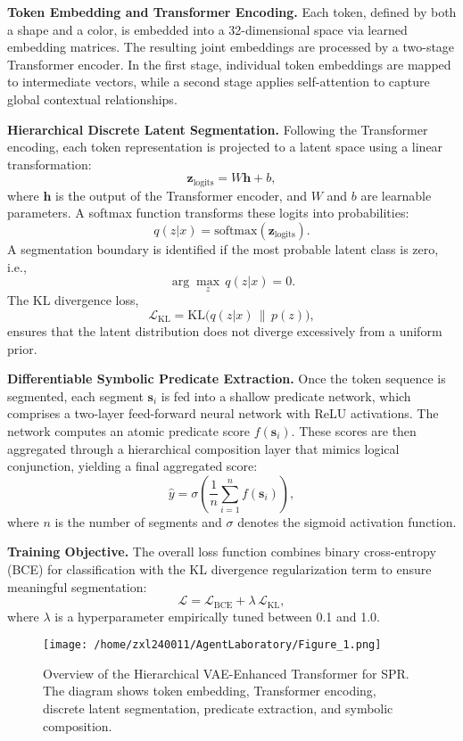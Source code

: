 \documentclass{article}
\begin{document}
\textbf{Token Embedding and Transformer Encoding.} Each token, defined by both a shape and a color, is embedded into a 32-dimensional space via learned embedding matrices. The resulting joint embeddings are processed by a two-stage Transformer encoder. In the first stage, individual token embeddings are mapped to intermediate vectors, while a second stage applies self-attention to capture global contextual relationships.

\textbf{Hierarchical Discrete Latent Segmentation.} Following the Transformer encoding, each token representation is projected to a latent space using a linear transformation:
\[
\mathbf{z}_{\text{logits}} = W\mathbf{h} + b,
\]
where $\mathbf{h}$ is the output of the Transformer encoder, and $W$ and $b$ are learnable parameters. A softmax function transforms these logits into probabilities:
\[
q(z|x)=\text{softmax}(\mathbf{z}_{\text{logits}}).
\]
A segmentation boundary is identified if the most probable latent class is zero, i.e., 
\[
\arg\max_z\,q(z|x)=0.
\]
The KL divergence loss, 
\[
\mathcal{L}_{\text{KL}} = \mathrm{KL}\bigl(q(z|x) \,\|\, p(z)\bigr),
\]
ensures that the latent distribution does not diverge excessively from a uniform prior.

\textbf{Differentiable Symbolic Predicate Extraction.} Once the token sequence is segmented, each segment $\mathbf{s}_i$ is fed into a shallow predicate network, which comprises a two-layer feed-forward neural network with ReLU activations. The network computes an atomic predicate score $f(\mathbf{s}_i)$. These scores are then aggregated through a hierarchical composition layer that mimics logical conjunction, yielding a final aggregated score:
\[
\hat{y} = \sigma\left(\frac{1}{n}\sum_{i=1}^{n} f(\mathbf{s}_i)\right),
\]
where $n$ is the number of segments and $\sigma$ denotes the sigmoid activation function.

\textbf{Training Objective.} The overall loss function combines binary cross-entropy (BCE) for classification with the KL divergence regularization term to ensure meaningful segmentation:
\[
\mathcal{L} = \mathcal{L}_{\text{BCE}} + \lambda\, \mathcal{L}_{\text{KL}},
\]
where $\lambda$ is a hyperparameter empirically tuned between 0.1 and 1.0.

\begin{figure}[h]
\centering
\texttt{[image: /home/zxl240011/AgentLaboratory/Figure\_1.png]}
\caption{Overview of the Hierarchical VAE-Enhanced Transformer for SPR. The diagram shows token embedding, Transformer encoding, discrete latent segmentation, predicate extraction, and symbolic composition.}
\label{fig:fig1}
\end{figure}
\end{document}
